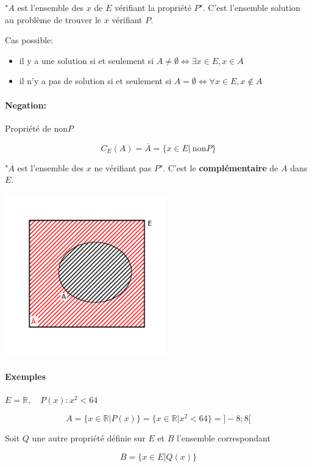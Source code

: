 \documentclass[
    11pt,
    a4paper,
    oneside,
    headinlcude, footinclude,
    twoside,
]{report}
\renewcommand{\bar}[1]{\overline{#1}}
\begin{document}
"$A$ est l'ensemble des $x$ de $E$ vérifiant la propriété $P$". C'est
l'ensemble solution au problème de trouver le $x$ vérifiant $P$.

Cas possible:

\begin{itemize}
    \item il y a une solution si et seulement si  $A \neq \emptyset \iff
        \exists x \in E, x \in A$

    \item il n'y a pas de solution si et seulement si $A = \emptyset \iff
        \forall x \in E, x \notin A$
\end{itemize}


\paragraph{Negation:} Propriété de $ \textrm{non}P $

$$C_{E}(A) = \bar A = \{x \in E | \ \textrm{non}P \}$$

"$\bar A$ est l'ensemble des $x$ ne vérifiant pas $P$". C'est le
\textbf{complémentaire}  de $A$ dans $E$.


\begin{center}
    \includegraphics[width=7cm]{fig2}
\end{center}

\paragraph{Exemples}
$E = \mathbb{R}, \quad P(x) : x^{2} < 64$

$$A = \{ x \in \mathbb{R} | P(x)\} = \{x \in \mathbb{R} | x^{2} < 64 \} = ]
-8; 8 [$$

Soit $Q$ une autre propriété définie sur $E$ et $B$ l'ensemble correspondant

$$B = \{x\in E| Q(x)\}$$
\end{document}
